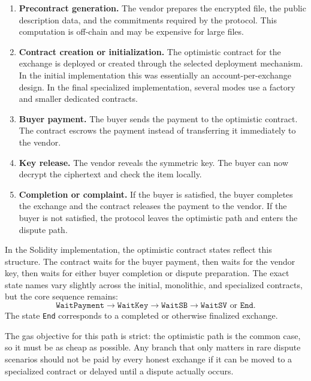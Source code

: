\begin{enumerate}
  \item \textbf{Precontract generation.} The vendor prepares the encrypted file, the public
  description data, and the commitments required by the protocol. This computation is
  off-chain and may be expensive for large files.

  \item \textbf{Contract creation or initialization.} The optimistic contract for the
  exchange is deployed or created through the selected deployment mechanism. In the initial
  implementation this was essentially an account-per-exchange design. In the final
  specialized implementation, several modes use a factory and smaller dedicated contracts.

  \item \textbf{Buyer payment.} The buyer sends the payment to the optimistic contract. The
  contract escrows the payment instead of transferring it immediately to the vendor.

  \item \textbf{Key release.} The vendor reveals the symmetric key. The buyer can now decrypt
  the ciphertext and check the item locally.

  \item \textbf{Completion or complaint.} If the buyer is satisfied, the buyer completes the
  exchange and the contract releases the payment to the vendor. If the buyer is not
  satisfied, the protocol leaves the optimistic path and enters the dispute path.
\end{enumerate}

In the Solidity implementation, the optimistic contract states reflect this structure. The
contract waits for the buyer payment, then waits for the vendor key, then waits for either
buyer completion or dispute preparation. The exact state names vary slightly across the
initial, monolithic, and specialized contracts, but the core sequence remains:
\[
  \texttt{WaitPayment}
  \rightarrow
  \texttt{WaitKey}
  \rightarrow
  \texttt{WaitSB}
  \rightarrow
  \texttt{WaitSV} \text{ or } \texttt{End}.
\]
The state \texttt{End} corresponds to a completed or otherwise finalized exchange.

The gas objective for this path is strict: the optimistic path is the common case, so it must
be as cheap as possible. Any branch that only matters in rare dispute scenarios should not be
paid by every honest exchange if it can be moved to a specialized contract or delayed until a
dispute actually occurs.

